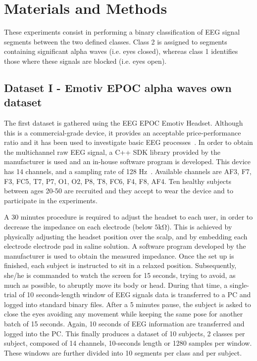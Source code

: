\section{Materials and Methods}

These experiments consist in performing a binary classification of EEG signal segments between the two defined classes.  Class 2 is assigned to segments containing significant alpha waves (i.e. eyes closed), whereas class 1 identifies those where these signals are blocked (i.e. eyes open).


\subsection{Dataset I - Emotiv EPOC alpha waves own dataset}
\label{dataset1}
The first dataset is gathered using the EEG EPOC Emotiv Headset.  Although this is a commercial-grade device, it provides an acceptable price-performance ratio and it has been used to investigate basic EEG processes~\cite{Debener2012,DeVos2014}. In order to obtain the multichannel raw EEG signal, a C++ SDK library provided by the manufacturer is used and an in-house software program is developed. This device has 14 channels, and a sampling rate of 128 \si{Hz}~\cite{Stopczynski2014}. Available channels are AF3, F7, F3, FC5, T7, P7, O1, O2, P8, T8,  FC6, F4, F8, AF4.  Ten healthy subjects between ages 20-50 are recruited and they accept to wear the device and to participate in the experiments.  

A 30 minutes procedure is required to adjust the headset to each user, in order to decrease the impedance on each electrode (below $5 \si{\kilo\ohm}$).  
This is achieved by physically adjusting the headset position over the scalp, and by embedding each electrode electrode pad in saline solution.
A software program developed by the manufacturer is used to obtain the measured impedance.  Once the set up is finished, each subject is instructed to sit in a relaxed position. Subsequently, she/he is commanded to watch the screen for 15 seconds, trying to avoid, as much as possible, to abruptly move its body or head.  During that time, a single-trial of 10 seconds-length window of EEG signals data is transferred to a PC and logged into standard binary files. After a 5 minutes pause, the subject is asked to close the eyes avoiding any movement while keeping the same pose for another batch of 15 seconds.  Again, 10 seconds of EEG information are transferred and logged into the PC. This finally produces a dataset of 10 subjects,  2 classes per subject, composed of 14 channels, 10-seconds length or 1280 samples per window.  These windows are further divided into 10 segments per class and per subject.

